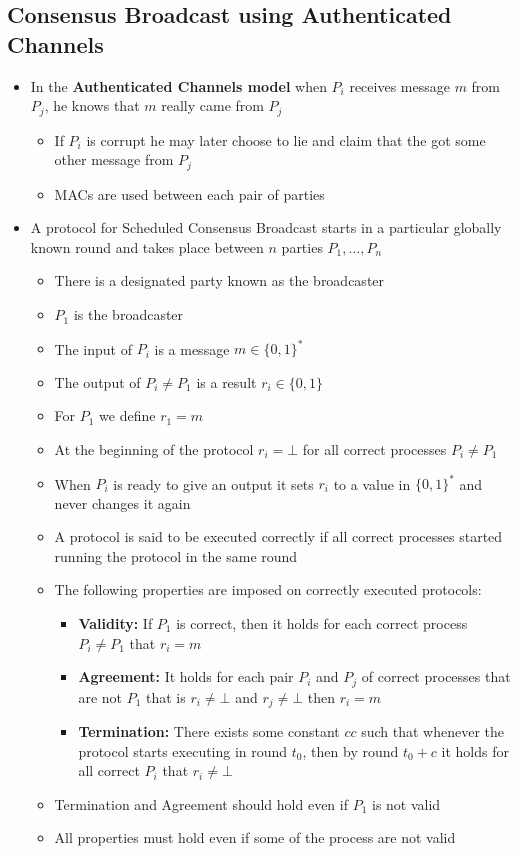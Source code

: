 \documentclass[11pt]{article}
\begin{document}
\subsection{Consensus Broadcast using Authenticated Channels}
\label{sec:org88e9be6}
\begin{itemize}
\item In the \textbf{Authenticated Channels model} when \(P_i\) receives message \(m\) from \(P_j\), he knows that \(m\) really came from \(P_j\)
\begin{itemize}
\item If \(P_i\) is corrupt he may later choose to lie and claim that the got some other message from \(P_j\)
\item MACs are used between each pair of parties
\end{itemize}

\item A protocol for Scheduled Consensus Broadcast starts in a particular globally known round and takes place between \(n\) parties \(P_1, \dots, P_n\)
\begin{itemize}
\item There is a designated party known as the broadcaster
\item \(P_1\) is the broadcaster
\item The input of \(P_i\) is a message \(m \in \{0,1\}^*\)
\item The output of \(P_i \ne P_1\) is a result \(r_i \in \{0,1\}\)
\item For \(P_1\) we define \(r_1=m\)
\item At the beginning of the protocol \(r_i = \bot\) for all correct processes \(P_i \ne P_1\)
\item When \(P_i\) is ready to give an output it sets \(r_i\) to a value in \(\{0,1\}^*\) and never changes it again
\item A protocol is said to be executed correctly if all correct processes started running the protocol in the same round
\item The following properties are imposed on correctly executed protocols:
\begin{itemize}
\item \textbf{Validity:} If \(P_1\) is correct, then it holds for each correct process \(P_i \ne P_1\) that \(r_i=m\)
\item \textbf{Agreement:} It holds for each pair \(P_i\) and \(P_j\) of correct processes that are not \(P_1\) that is \(r_i \ne \bot\) and \(r_j \ne \bot\) then \(r_i = m\)
\item \textbf{Termination:} There exists some constant \(cc\) such that whenever the protocol starts executing in round \(t_0\), then by round \(t_0 + c\) it holds for all correct \(P_i\) that \(r_i \ne \bot\)
\end{itemize}
\item Termination and Agreement should hold even if \(P_1\) is not valid
\item All properties must hold even if some of the process are not valid
\end{itemize}


\end{itemize}
\end{document}
